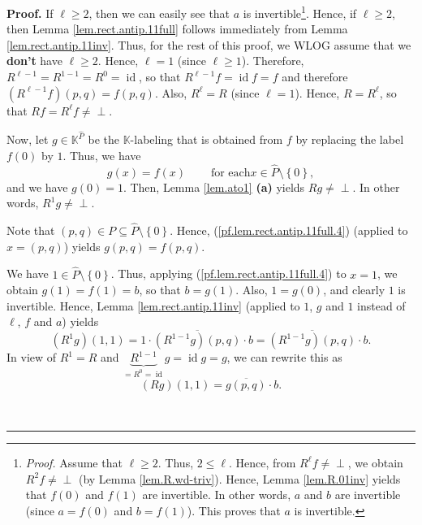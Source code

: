 \documentclass[numbers=enddot,12pt,final,onecolumn,notitlepage]{scrartcl}%
\theoremstyle{definition}
\newenvironment{verlong}{}{}
\newcommand{\undf}{\operatorname*{\bot}}
\newenvironment{proof}[1][Proof]{\noindent\textbf{#1.} }{\ \rule{0.5em}{0.5em}}
\begin{document}
\begin{verlong}


\begin{proof}
If $\ell\geq2$, then we can easily see that $a$ is
invertible\footnote{\textit{Proof.} Assume that $\ell\geq2$. Thus, $2\leq\ell
$. Hence, from $R^{\ell}f\neq\undf$, we obtain $R^{2}f\neq\undf$ (by Lemma
\ref{lem.R.wd-triv}). Hence, Lemma \ref{lem.R.01inv} yields that $f\left(
0\right)  $ and $f\left(  1\right)  $ are invertible. In other words, $a$ and
$b$ are invertible (since $a=f\left(  0\right)  $ and $b=f\left(  1\right)
$). This proves that $a$ is invertible.}. Hence, if $\ell\geq2$, then Lemma
\ref{lem.rect.antip.11full} follows immediately from Lemma
\ref{lem.rect.antip.11inv}. Thus, for the rest of this proof, we WLOG assume
that we \textbf{don't} have $\ell\geq2$. Hence, $\ell=1$ (since $\ell\geq1$).
Therefore, $R^{\ell-1}=R^{1-1}=R^{0}=\operatorname*{id}$, so that $R^{\ell
-1}f=\operatorname*{id}f=f$ and therefore $\left(  R^{\ell-1}f\right)  \left(
p,q\right)  =f\left(  p,q\right)  $. Also, $R^{\ell}=R$ (since $\ell=1$).
Hence, $R=R^{\ell}$, so that $Rf=R^{\ell}f\neq\undf$.

Now, let $g\in\mathbb{K}^{\widehat{P}}$ be the $\mathbb{K}$-labeling that is
obtained from $f$ by replacing the label $f\left(  0\right)  $ by $1$. Thus,
we have
\begin{equation}
g\left(  x\right)  =f\left(  x\right)  \ \ \ \ \ \ \ \ \ \ \text{for each
}x\in\widehat{P}\setminus\left\{  0\right\}  ,
\label{pf.lem.rect.antip.11full.4}%
\end{equation}
and we have $g\left(  0\right)  =1$. Then, Lemma \ref{lem.ato1} \textbf{(a)}
yields $Rg\neq\undf$. In other words, $R^{1}g\neq\undf$.

Note that $\left(  p,q\right)  \in P\subseteq\widehat{P}\setminus\left\{
0\right\}  $. Hence, (\ref{pf.lem.rect.antip.11full.4}) (applied to $x=\left(
p,q\right)  $) yields $g\left(  p,q\right)  =f\left(  p,q\right)  $.

We have $1\in\widehat{P}\setminus\left\{  0\right\}  $. Thus, applying
(\ref{pf.lem.rect.antip.11full.4}) to $x=1$, we obtain $g\left(  1\right)
=f\left(  1\right)  =b$, so that $b=g\left(  1\right)  $. Also, $1=g\left(
0\right)  $, and clearly $1$ is invertible. Hence, Lemma
\ref{lem.rect.antip.11inv} (applied to $1$, $g$ and $1$ instead of $\ell$, $f$
and $a$) yields
\[
\left(  R^{1}g\right)  \left(  1,1\right)  =1\cdot\overline{\left(
R^{1-1}g\right)  \left(  p,q\right)  }\cdot b=\overline{\left(  R^{1-1}%
g\right)  \left(  p,q\right)  }\cdot b.
\]
In view of $R^{1}=R$ and $\underbrace{R^{1-1}}_{=R^{0}=\operatorname*{id}%
}g=\operatorname*{id}g=g$, we can rewrite this as
\[
\left(  Rg\right)  \left(  1,1\right)  =\overline{g\left(  p,q\right)  }\cdot
b.
\]



\end{proof}
\end{verlong}
\end{document}
